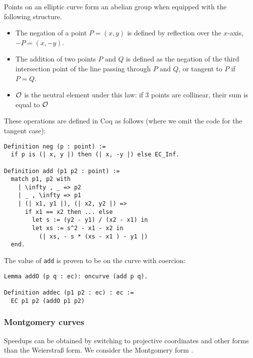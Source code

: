 Points on an elliptic curve form an abelian group when equipped with the following structure.%
\begin{itemize}
  \item The negation of a point $P = (x,y)$ is defined by reflection over the $x$-axis, \ie $-P = (x, -y)$.
  \item The addition of two points $P$ and $Q$ is defined as the negation of the third intersection point
        of the line passing through $P$ and $Q$, or tangent to $P$ if $P = Q$.
  \item $\mathcal{O}$ is the neutral element under this law: if 3 points are collinear, their sum is equal to $\mathcal{O}$
\end{itemize}
These operations are defined in Coq as follows (where we omit the code for the tangent case):
\begin{lstlisting}[language=Coq]
Definition neg (p : point) :=
  if p is (| x, y |) then (| x, -y |) else EC_Inf.

Definition add (p1 p2 : point) :=
  match p1, p2 with
    | \infty , _ => p2
    | _ , \infty => p1
    | (| x1, y1 |), (| x2, y2 |) =>
      if x1 == x2 then ... else
        let s := (y2 - y1) / (x2 - x1) in
        let xs := s^2 - x1 - x2 in
          (| xs, - s * (xs - x1 ) - y1 |)
  end.
\end{lstlisting}
The value of \texttt{add} is proven to be on the curve with coercion:
\begin{lstlisting}[language=Coq]
Lemma addO (p q : ec): oncurve (add p q).

Definition addec (p1 p2 : ec) : ec :=
  EC p1 p2 (addO p1 p2)
\end{lstlisting}

\subsubsection{Montgomery curves}
\label{subsec:ECC-Montgomery}

Speedups can be obtained by switching to projective coordinates and other forms
than the Weierstra{\ss} form. We consider the Montgomery form \cite{MontgomerySpeeding}.


